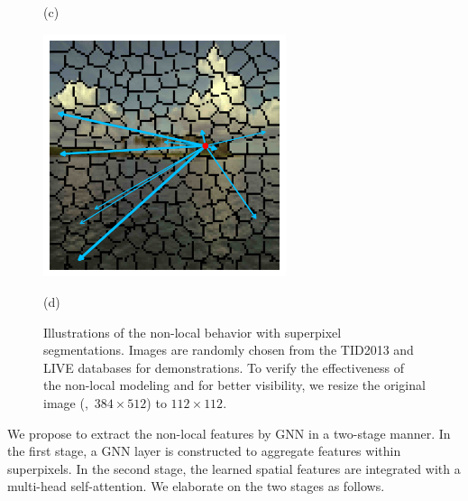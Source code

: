 \begin{figure}[!ht]
\begin{minipage}[t]{.49\linewidth}
		\centerline{(c)}
		\label{MONARCH}
	\end{minipage}
	\begin{minipage}[t]{.49\linewidth}
		\includegraphics[width=2.8in]{images/ocean_superpixel.jpg}
		\centerline{(d)}
		\label{OCEAN}
	\end{minipage}
	\caption{Illustrations of the non-local behavior with superpixel segmentations. Images are randomly chosen from the TID2013 and LIVE databases for demonstrations. To verify the effectiveness of the non-local modeling and for better visibility, we resize the original image (\eg,~$384 \times 512$) to $112 \times 112$.}
	\label{Non-local Behavior from the TID2013 database with superpixel - 1}
\end{figure}

We propose to extract the non-local features by GNN in a two-stage manner. In the first stage, a GNN layer is constructed to aggregate features within superpixels. In the second stage, the learned spatial features are integrated with a multi-head self-attention. We elaborate on the two stages as follows. 

